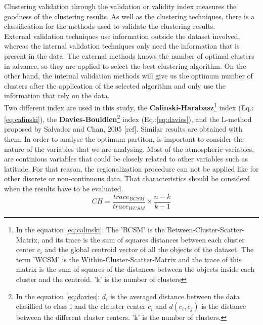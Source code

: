 Clustering validation through the validation or validity index measures the goodness of the clustering results. As well as the clustering techniques, there is a classification for the methods used to validate the clustering results.\\

External validation techniques use information outside the dataset involved, whereas the internal validation techniques only need the information that is present in the data. The external methods knows the number of optimal clusters in advance, so they are applied to select the best clustering algorithm. On the other hand, the internal validation methods will give us the optimum number of clusters after the application of the selected algorithm and only use the information that rely on the data.\\

Two different index are used in this study, the \textbf{Calinski-Harabasz}\footnote{In the equation \ref{eq:calinski}: The 'BCSM' is the Between-Cluster-Scatter-Matrix, and its trace is the sum of squares distances between each cluster center $c_{i}$ and the global centroid vector of all the objects of the dataset. The term 'WCSM' is the Within-Cluster-Scatter-Matrix and the trace of this matrix is the sum of squares of the distances between the objects inside each cluster and the centroid. 'k' is the number of clusters} index (Eq.:\ref{eq:calinski}), the \textbf{Davies-Bouldien}\footnote{In the equation \ref{eq:davies}: $d_{i}$ is the averaged distance between the data clasiffied to class i and the clauster center $c_{i}$ and $d(c_i,c_j)$ is the distance between the different cluster centers. 'k' is the number of clusters.}  index (Eq.:\ref{eq:davies}), and the L-method proposed by Salvador and Chan, 2005 [ref]. Similar results are obtained with them. In order to analyse the optimum partiton, is important to consider the nature of the variables that we are analysing. Most of the atmospheric variables, are continious variables that could be closely related to other variables such as latitude. For that reason, the regionalization procedure can not be applied like for other discrete or non-continuous data. That characteristics should be considerd when the results have to be evaluated.\\

\begin{equation}\label{eq:calinski}
    CH =\frac{trace_{BCSM}}{trace_{WCSM}}\times\frac{n-k}{k-1}
\end{equation}

